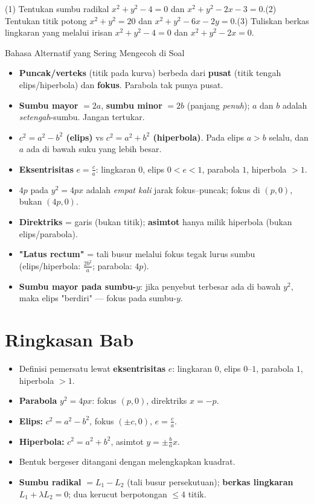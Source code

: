 \documentclass[11pt,a4paper]{report}
\theoremstyle{gaya}
\begin{document}
\begin{latihan}
(1) Tentukan sumbu radikal $x^2+y^2-4=0$ dan $x^2+y^2-2x-3=0$.\quad (2) Tentukan titik potong $x^2+y^2=20$ dan $x^2+y^2-6x-2y=0$.\quad (3) Tuliskan berkas lingkaran yang melalui irisan $x^2+y^2-4=0$ dan $x^2+y^2-2x=0$.
\end{latihan}

\begin{konsep}{Bahasa Alternatif yang Sering Mengecoh di Soal}
\begin{itemize}[leftmargin=*,topsep=2pt]
  \item \textbf{Puncak/verteks} (titik pada kurva) berbeda dari \textbf{pusat} (titik tengah elips/hiperbola) dan \textbf{fokus}. Parabola tak punya pusat.
  \item \textbf{Sumbu mayor} $=2a$, \textbf{sumbu minor} $=2b$ (panjang \emph{penuh}); $a$ dan $b$ adalah \emph{setengah}-sumbu. Jangan tertukar.
  \item \textbf{$c^2=a^2-b^2$ (elips)} vs \textbf{$c^2=a^2+b^2$ (hiperbola)}. Pada elips $a>b$ selalu, dan $a$ ada di bawah suku yang lebih besar.
  \item \textbf{Eksentrisitas} $e=\tfrac ca$: lingkaran $0$, elips $0<e<1$, parabola $1$, hiperbola $>1$.
  \item \textbf{$4p$} pada $y^2=4px$ adalah \emph{empat kali} jarak fokus--puncak; fokus di $(p,0)$, bukan $(4p,0)$.
  \item \textbf{Direktriks} = garis (bukan titik); \textbf{asimtot} hanya milik hiperbola (bukan elips/parabola).
  \item \textbf{"Latus rectum"} = tali busur melalui fokus tegak lurus sumbu (elips/hiperbola: $\tfrac{2b^2}{a}$; parabola: $4p$).
  \item \textbf{Sumbu mayor pada sumbu-$y$}: jika penyebut terbesar ada di bawah $y^2$, maka elips "berdiri" --- fokus pada sumbu-$y$.
\end{itemize}
\end{konsep}

\section*{Ringkasan Bab}
\begin{itemize}[leftmargin=*,topsep=2pt]
  \item Definisi pemersatu lewat \textbf{eksentrisitas} $e$: lingkaran $0$, elips $0$--$1$, parabola $1$, hiperbola $>1$.
  \item \textbf{Parabola} $y^2=4px$: fokus $(p,0)$, direktriks $x=-p$.
  \item \textbf{Elips:} $c^2=a^2-b^2$, fokus $(\pm c,0)$, $e=\tfrac ca$.
  \item \textbf{Hiperbola:} $c^2=a^2+b^2$, asimtot $y=\pm\tfrac ba x$.
  \item Bentuk bergeser ditangani dengan melengkapkan kuadrat.
  \item \textbf{Sumbu radikal} $=L_1-L_2$ (tali busur persekutuan); \textbf{berkas lingkaran} $L_1+\lambda L_2=0$; dua kerucut berpotongan $\le4$ titik.
\end{itemize}
\end{document}
